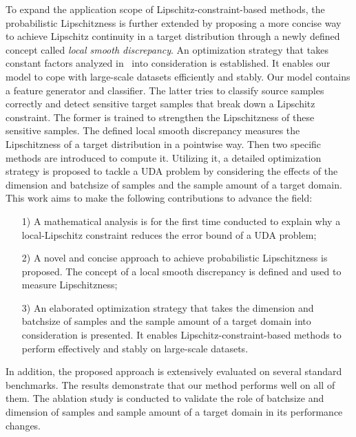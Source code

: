 \documentclass[journal,twocolumn]{IEEEtran}
\theoremstyle{definition}
\begin{document}
To expand the application scope of Lipschitz-constraint-based methods, the probabilistic Lipschitzness is further extended by proposing a more concise way to achieve Lipschitz continuity in a target distribution through a newly defined concept called \emph{local smooth discrepancy}. An optimization strategy that takes constant factors analyzed in~\cite{Ben-David2014} into consideration is established. It enables our model to cope with large-scale datasets efficiently and stably. Our model contains a feature generator and classifier. The latter tries to classify source samples correctly and detect sensitive target samples that break down a Lipschitz constraint. The former is trained to strengthen the Lipschitzness of these sensitive samples. The defined local smooth discrepancy measures the  Lipschitzness of a target distribution in a pointwise way. Then two specific methods are introduced to compute it. Utilizing it, a detailed optimization strategy is proposed to tackle a UDA problem by considering the effects of the dimension and batchsize of samples and the sample amount of a target domain. This work aims to make the following contributions to advance the field:
\begin{itemize}
\item[1)] A mathematical analysis is for the first time conducted to explain why a local-Lipschitz constraint reduces the error bound of a UDA problem;
\item[2)] A novel and concise approach to achieve probabilistic Lipschitzness is proposed. The concept of a local smooth discrepancy is defined and used to measure Lipschitzness;
\item[3)] An elaborated optimization strategy that takes the dimension and batchsize of samples  and the sample amount of a target domain into consideration is presented. It enables Lipschitz-constraint-based methods to perform effectively and stably on large-scale datasets.
\end{itemize}
In addition, the proposed approach is extensively evaluated on several standard benchmarks. The results demonstrate that our method performs well on all of them. The ablation study is conducted to validate the role of batchsize and dimension of samples and sample amount of a target domain in its performance changes. 
\end{document}
